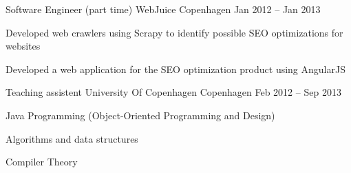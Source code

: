 \begin{cventries}
  \cventry
    {Software Engineer (part time)} %
    {WebJuice} %
    {Copenhagen} %
    {Jan 2012 – Jan 2013} %
    {
      \begin{cvitems} %
	\item {Developed web crawlers using Scrapy to identify possible SEO optimizations for websites}
	\item {Developed a web application for the SEO optimization product using AngularJS}
      \end{cvitems}
    }

  \cventry
    {Teaching assistent} %
    {University Of Copenhagen} %
    {Copenhagen} %
    {Feb 2012 – Sep 2013} %
    {
      \begin{cvitems} %
	\item {Java Programming (Object-Oriented Programming and Design)}
	\item {Algorithms and data structures}
	\item {Compiler Theory}
      \end{cvitems}
    }


\end{cventries}
